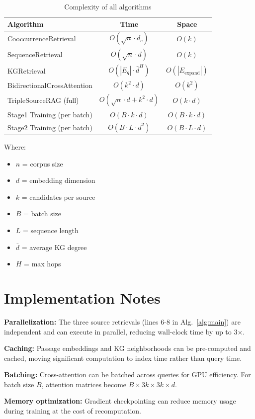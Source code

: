 \documentclass[11pt]{article}
\begin{document}
\begin{table}[H]
\centering
\caption{Complexity of all algorithms}
\begin{tabular}{@{}lcc@{}}
\toprule
\textbf{Algorithm} & \textbf{Time} & \textbf{Space} \\
\midrule
CooccurrenceRetrieval & $O(\sqrt{n} \cdot d_c)$ & $O(k)$ \\
SequenceRetrieval & $O(\sqrt{n} \cdot d)$ & $O(k)$ \\
KGRetrieval & $O(|E_q| \cdot \bar{d}^H)$ & $O(|E_{\text{expand}}|)$ \\
BidirectionalCrossAttention & $O(k^2 \cdot d)$ & $O(k^2)$ \\
TripleSourceRAG (full) & $O(\sqrt{n} \cdot d + k^2 \cdot d)$ & $O(k \cdot d)$ \\
\midrule
Stage1 Training (per batch) & $O(B \cdot k \cdot d)$ & $O(B \cdot k \cdot d)$ \\
Stage2 Training (per batch) & $O(B \cdot L \cdot d^2)$ & $O(B \cdot L \cdot d)$ \\
\bottomrule
\end{tabular}
\end{table}

Where:
\begin{itemize}
    \item $n$ = corpus size
    \item $d$ = embedding dimension
    \item $k$ = candidates per source
    \item $B$ = batch size
    \item $L$ = sequence length
    \item $\bar{d}$ = average KG degree
    \item $H$ = max hops
\end{itemize}

\section{Implementation Notes}

\textbf{Parallelization:} The three source retrievals (lines 6-8 in Alg.~\ref{alg:main}) are independent and can execute in parallel, reducing wall-clock time by up to 3×.

\textbf{Caching:} Passage embeddings and KG neighborhoods can be pre-computed and cached, moving significant computation to index time rather than query time.

\textbf{Batching:} Cross-attention can be batched across queries for GPU efficiency. For batch size $B$, attention matrices become $B \times 3k \times 3k \times d$.

\textbf{Memory optimization:} Gradient checkpointing can reduce memory usage during training at the cost of recomputation.
\end{document}
